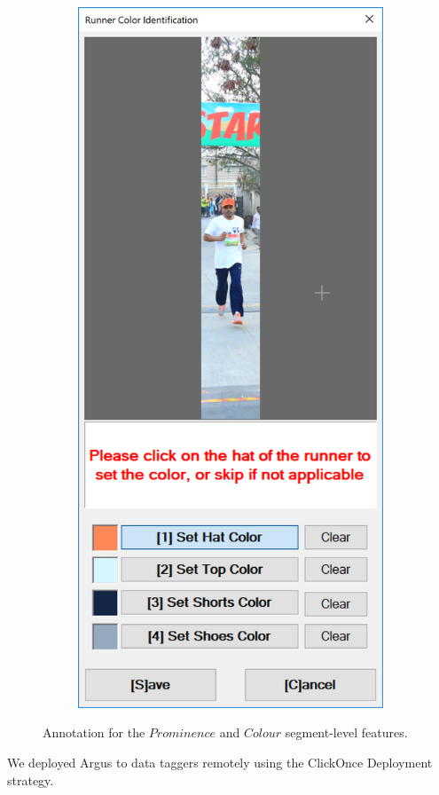 \begin{figure}
\begin{subfigure}[b]{0.45\textwidth}
  \end{subfigure}
  \hspace{\fill}
  \begin{subfigure}[b]{0.45\textwidth}
    \includegraphics[width=\textwidth]{images/dataset/argus/argus_color_entry}
  \end{subfigure}
  \hspace{\fill}
  \caption[Prominence and Colour feature annotation with Argus]{Annotation for the $Prominence$ and $Colour$ segment-level features.}
  \label{fig:dataset:argus:prom_and_col}
\end{figure}

We deployed Argus to data taggers remotely using the ClickOnce Deployment strategy.